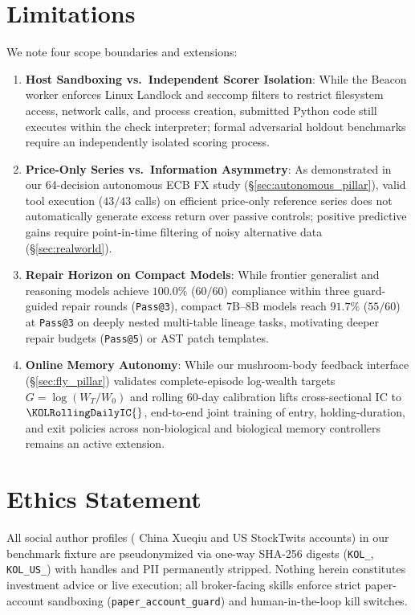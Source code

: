 \section*{Limitations}
\label{sec:limitations}
\vspace{-0.14cm}
We note four scope boundaries and extensions:
\begin{enumerate}\setlength{\itemsep}{0.5pt}\setlength{\parskip}{0pt}\setlength{\topsep}{1.5pt}
    \item \textbf{Host Sandboxing vs.\ Independent Scorer Isolation}: While the Beacon worker enforces Linux Landlock and seccomp filters to restrict filesystem access, network calls, and process creation, submitted Python code still executes within the check interpreter; formal adversarial holdout benchmarks require an independently isolated scoring process.
    \item \textbf{Price-Only Series vs.\ Information Asymmetry}: As demonstrated in our 64-decision autonomous ECB FX study (\S\ref{sec:autonomous_pillar}), valid tool execution ($43/43$ calls) on efficient price-only reference series does not automatically generate excess return over passive controls; positive predictive gains require point-in-time filtering of noisy alternative data (\S\ref{sec:realworld}).
    \item \textbf{Repair Horizon on Compact Models}: While frontier generalist and reasoning models achieve $100.0\%$ ($60/60$) compliance within three guard-guided repair rounds (\texttt{Pass@3}), compact $7\text{B}\text{--}8\text{B}$ models reach $91.7\%$ ($55/60$) at \texttt{Pass@3} on deeply nested multi-table lineage tasks, motivating deeper repair budgets (\texttt{Pass@5}) or AST patch templates.
    \item \textbf{Online Memory Autonomy}: While our mushroom-body feedback interface (\S\ref{sec:fly_pillar}) validates complete-episode log-wealth targets $G=\log(W_T/W_0)$ and rolling 60-day calibration lifts cross-sectional IC to $\KOLRollingDailyIC{}$, end-to-end joint training of entry, holding-duration, and exit policies across non-biological and biological memory controllers remains an active extension.
\end{enumerate}
\vspace{-0.22cm}
\section*{Ethics Statement}
\vspace{-0.14cm}
All \KOLTotalAccounts{} social author profiles (\KOLCNCount{} China Xueqiu and \KOLUSCount{} US StockTwits accounts) in our benchmark fixture are pseudonymized via one-way SHA-256 digests (\texttt{KOL\_<10-hex>}, \texttt{KOL\_US\_<10-hex>}) with handles and PII permanently stripped. Nothing herein constitutes investment advice or live execution; all broker-facing skills enforce strict paper-account sandboxing (\texttt{paper\_account\_guard}) and human-in-the-loop kill switches.
\vspace{-0.20cm}

